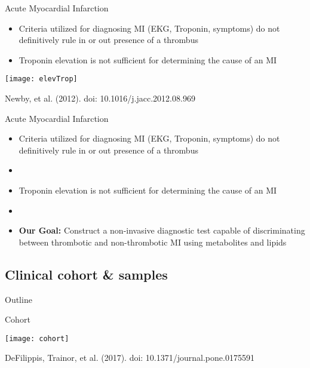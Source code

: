 \documentclass[xcolor=dvipsnames]{beamer}
\begin{document}
\begin{frame}{Acute Myocardial Infarction}
\vspace{-5pt}
\begin{itemize}
\item Criteria utilized for diagnosing MI (EKG, Troponin, symptoms) do not definitively rule in or out presence of a thrombus \pause
\item Troponin elevation is not sufficient for determining the cause of an MI \pause
\end{itemize}
\begin{center}
\texttt{[image: elevTrop]}

Newby, et al. (2012). doi: 10.1016/j.jacc.2012.08.969
\end{center}
\end{frame}

\begin{frame}{Acute Myocardial Infarction}
\vspace{-5pt}
\begin{itemize}
	\item Criteria utilized for diagnosing MI (EKG, Troponin, symptoms) do not definitively rule in or out presence of a thrombus \pause
	\item[]
	\item Troponin elevation is not sufficient for determining the cause of an MI \pause
	\item[]
	\item \textbf{Our Goal:} Construct a non-invasive diagnostic test capable of discriminating between thrombotic and non-thrombotic MI using metabolites and lipids
\end{itemize}
\end{frame}

\subsection{Clinical cohort \& samples}
\begin{frame}{Outline}
\vspace{-10.5pt}
\tableofcontents[currentsection,subsectionstyle=show/shaded/hide]
\end{frame}

\begin{frame}{Cohort}
\vspace{-10pt}
\begin{center}
\texttt{[image: cohort]}

DeFilippis, Trainor, et al. (2017). doi: 10.1371/journal.pone.0175591
\end{center}
\end{frame}
\end{document}
